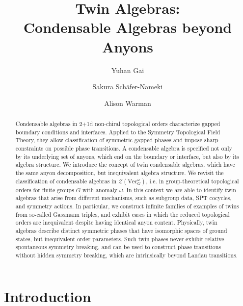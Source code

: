 \documentclass[aps,twocolumn,prx,floatfix,preprintnumbers, nofootinbib,10pt]{revtex4-2}
\numberwithin{equation}{section}
\theoremstyle{definition}
\begin{document}
\title{Twin Algebras: \\
Condensable Algebras beyond Anyons}

\author{Yuhan Gai}
\author{Sakura Sch\"afer-Nameki}
\author{Alison Warman}




\begin{abstract}
\noindent 
Condensable algebras in 2+1d non-chiral topological orders characterize gapped boundary conditions and interfaces. 
Applied to the Symmetry Topological Field Theory, they allow classification of symmetric gapped phases and impose sharp constraints on possible phase transitions. 
A condensable algebra is specified not only by its underlying set of anyons, which end on the boundary or interface, but also by its algebra structure. 
We introduce the concept of twin condensable algebras, which have the same anyon decomposition, but inequivalent algebra structure. 
We revisit the classification of condensable algebras in $\mathcal{Z}(\text{Vec}_G^\omega)$, i.e. in group-theoretical topological orders for finite groups $G$ with anomaly $\omega$. 
In this context we are able to identify twin algebras that arise from different mechanisms, such as subgroup data, SPT cocycles, and symmetry actions. 
In particular, we construct infinite families of examples of twins from so-called Gassmann triples, and exhibit cases in which the reduced topological orders are inequivalent despite having identical anyon content. 
Physically, twin algebras describe distinct symmetric phases that
have isomorphic spaces of ground states, but inequivalent order parameters. Such twin phases never exhibit relative spontaneous symmetry breaking, and can be used to construct phase transitions without hidden symmetry breaking, which are intrinsically beyond Landau transitions.
\end{abstract}




\maketitle
\tableofcontents

\section{Introduction}
\label{sec:Intro}
\end{document}
